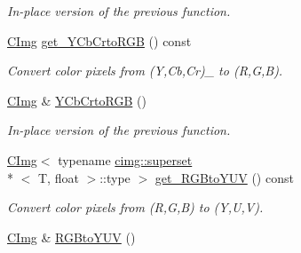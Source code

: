\begin{DoxyCompactItemize}
\begin{DoxyCompactList}\small\item\em In-\/place version of the previous function. \end{DoxyCompactList}\item 
\hypertarget{structcimg__library_1_1_c_img_a22f571efbd6926153c907f46e156a87e}{\hyperlink{structcimg__library_1_1_c_img}{C\-Img} \hyperlink{structcimg__library_1_1_c_img_a22f571efbd6926153c907f46e156a87e}{get\-\_\-\-Y\-Cb\-Crto\-R\-G\-B} () const }\label{structcimg__library_1_1_c_img_a22f571efbd6926153c907f46e156a87e}

\begin{DoxyCompactList}\small\item\em Convert color pixels from (Y,Cb,Cr)\-\_ to (R,G,B). \end{DoxyCompactList}\item 
\hypertarget{structcimg__library_1_1_c_img_ac17669d7f5b1cafff5fdf342632d08d3}{\hyperlink{structcimg__library_1_1_c_img}{C\-Img} \& \hyperlink{structcimg__library_1_1_c_img_ac17669d7f5b1cafff5fdf342632d08d3}{Y\-Cb\-Crto\-R\-G\-B} ()}\label{structcimg__library_1_1_c_img_ac17669d7f5b1cafff5fdf342632d08d3}

\begin{DoxyCompactList}\small\item\em In-\/place version of the previous function. \end{DoxyCompactList}\item 
\hypertarget{structcimg__library_1_1_c_img_ab2861294c6bb2755b24cff6470e0c471}{\hyperlink{structcimg__library_1_1_c_img}{C\-Img}$<$ typename \hyperlink{structcimg__library_1_1cimg_1_1superset}{cimg\-::superset}\\*
$<$ T, float $>$\-::type $>$ \hyperlink{structcimg__library_1_1_c_img_ab2861294c6bb2755b24cff6470e0c471}{get\-\_\-\-R\-G\-Bto\-Y\-U\-V} () const }\label{structcimg__library_1_1_c_img_ab2861294c6bb2755b24cff6470e0c471}

\begin{DoxyCompactList}\small\item\em Convert color pixels from (R,G,B) to (Y,U,V). \end{DoxyCompactList}\item 
\hypertarget{structcimg__library_1_1_c_img_ab45036f39a42c34a49618877abb4c9e7}{\hyperlink{structcimg__library_1_1_c_img}{C\-Img} \& \hyperlink{structcimg__library_1_1_c_img_ab45036f39a42c34a49618877abb4c9e7}{R\-G\-Bto\-Y\-U\-V} ()}\label{structcimg__library_1_1_c_img_ab45036f39a42c34a49618877abb4c9e7}


\end{DoxyCompactItemize}
